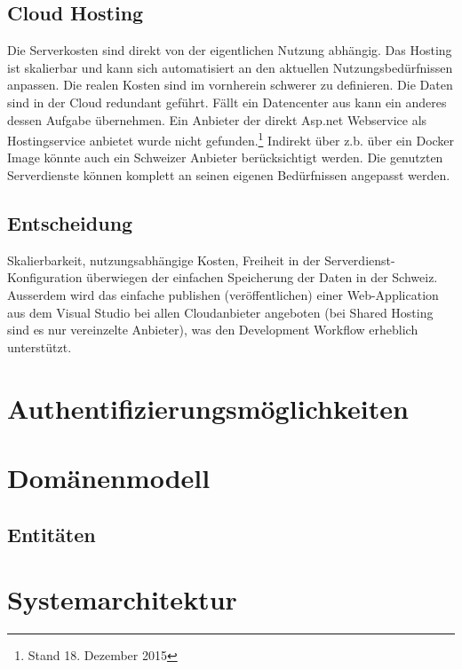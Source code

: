 \subsection{Cloud Hosting}\label{cloud-hosting}

Die Serverkosten sind direkt von der eigentlichen Nutzung abhängig. Das
Hosting ist skalierbar und kann sich automatisiert an den aktuellen
Nutzungsbedürfnissen anpassen. Die realen Kosten sind im vornherein
schwerer zu definieren. Die Daten sind in der Cloud redundant geführt.
Fällt ein Datencenter aus kann ein anderes dessen Aufgabe übernehmen.
Ein Anbieter der direkt Asp.net Webservice als Hostingservice anbietet
wurde nicht gefunden.\footnote{Stand 18. Dezember 2015} Indirekt über
z.b. über ein Docker Image könnte auch ein Schweizer Anbieter
berücksichtigt werden. Die genutzten Serverdienste können komplett an
seinen eigenen Bedürfnissen angepasst werden.

\subsection{Entscheidung}\label{entscheidung-2}

Skalierbarkeit, nutzungsabhängige Kosten, Freiheit in der
Serverdienst-Konfiguration überwiegen der einfachen Speicherung der
Daten in der Schweiz. Ausserdem wird das einfache publishen
(veröffentlichen) einer Web-Application aus dem Visual Studio bei allen
Cloudanbieter angeboten (bei Shared Hosting sind es nur vereinzelte
Anbieter), was den Development Workflow erheblich unterstützt.

\section{Authentifizierungsmöglichkeiten}\label{authentifizierungsmuxf6glichkeiten}

\section{Domänenmodell}\label{domuxe4nenmodell}

\subsection{Entitäten}\label{entituxe4ten}

\section{Systemarchitektur}\label{systemarchitektur}

